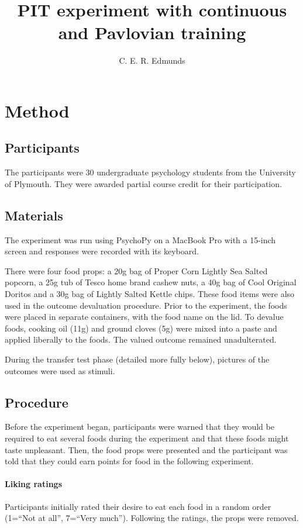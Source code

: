 \documentclass[12pt]{article}
\title{PIT experiment with continuous and Pavlovian training}
\author{C. E. R. Edmunds}
\date{}%
\begin{document}

\newpage
\doublespacing

\section{Method}
\subsection{Participants}
The participants were 30 undergraduate psychology students from the University of Plymouth. They were awarded partial course credit for their participation. 

\subsection{Materials}
The experiment was run using PsychoPy \cite{Peirce2007, Peirce2009} on a 
MacBook Pro with a 15-inch screen and responses were recorded with
its keyboard.

There were four food props: a 20g bag of Proper Corn Lightly Sea Salted popcorn, a 25g tub of Tesco home brand cashew nuts, a 40g bag of Cool Original Doritos and a 30g bag of Lightly Salted Kettle chips. These food items were also used in the outcome
devaluation procedure. Prior to the experiment, the foods were placed in
separate containers, with the food name on the lid. To devalue foods, cooking
oil (11g) and ground cloves (5g) were mixed into a paste and applied liberally
to the foods. The valued outcome remained unadulterated. 

During the transfer test phase (detailed more fully below), pictures of the
outcomes were used as stimuli. 

\subsection{Procedure}
Before the experiment began, participants were warned that they would be
required to eat several foods during the experiment and that these foods might
taste unpleasant. Then, the food props were presented and the participant was
told that they could earn points for food in the following experiment.

\paragraph{Liking ratings} Participants initially rated their desire to eat
each food in a random order (1=``Not at all'', 7=``Very much''). Following the
ratings, the props were removed. 
\end{document}
